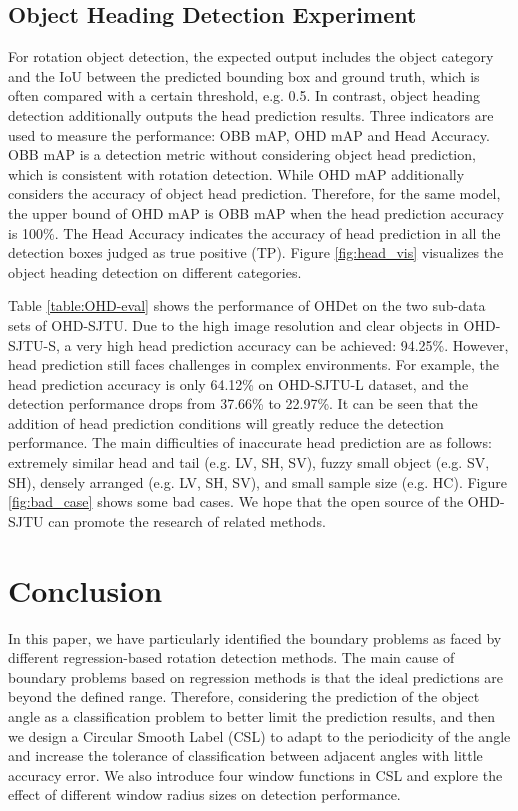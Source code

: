 \documentclass[10pt,journal,compsoc]{IEEEtran}
\begin{document}
\subsection{Object Heading Detection Experiment}\label{sec:ohdet_exp}
For rotation object detection, the expected output includes the object category and the IoU between the predicted bounding box and ground truth, which is often compared with a certain threshold, e.g. 0.5. In contrast, object heading detection additionally outputs the head prediction results. Three indicators are used to measure the performance: OBB mAP, OHD mAP and Head Accuracy. OBB mAP is a detection metric without considering object head prediction, which is consistent with rotation detection. While OHD mAP additionally considers the accuracy of object head prediction. Therefore, for the same model, the upper bound of OHD mAP is OBB mAP when the head prediction accuracy is 100\%. The Head Accuracy indicates the accuracy of head prediction in all the detection boxes judged as true positive (TP). Figure \ref{fig:head_vis} visualizes the object heading detection on different categories.

Table \ref{table:OHD-eval} shows the performance of OHDet on the two sub-data sets of OHD-SJTU. Due to the high image resolution and clear objects in OHD-SJTU-S, a very high head prediction accuracy can be achieved: 94.25\%. However, head prediction still faces challenges in complex environments. For example, the head prediction accuracy is only 64.12\% on OHD-SJTU-L dataset, and the detection performance drops from 37.66\% to 22.97\%. It can be seen that the addition of head prediction conditions will greatly reduce the detection performance. The main difficulties of inaccurate head prediction are as follows: extremely similar head and tail (e.g. LV, SH, SV), fuzzy small object (e.g. SV, SH), densely arranged (e.g. LV, SH, SV), and small sample size (e.g. HC). Figure \ref{fig:bad_case} shows some bad cases. We hope that the open source of the OHD-SJTU can promote the research of related methods.

\section{Conclusion}\label{sec:conclusion}
In this paper, we have particularly identified the boundary problems as faced by different regression-based rotation detection methods. The main cause of boundary problems based on regression methods is that the ideal predictions are beyond the defined range. Therefore, considering the prediction of the object angle as a classification problem to better limit the prediction results, and then we design a Circular Smooth Label (CSL) to adapt to the periodicity of the angle and increase the tolerance of classification between adjacent angles with little accuracy error. We also introduce four window functions in CSL and explore the effect of different window radius sizes on detection performance. 
\end{document}
